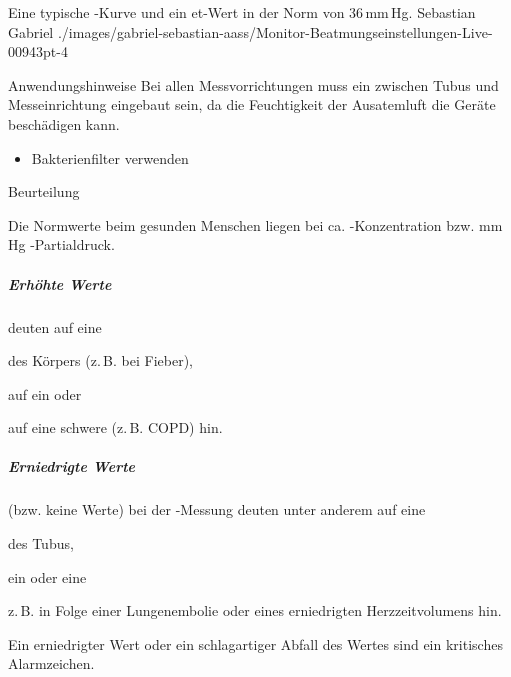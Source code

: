 {Eine typische -Kurve und ein et-Wert in der Norm von 36\,mm\,Hg.}%
{}%
{Sebastian Gabriel}%
{}%
{./images/gabriel-sebastian-aass/Monitor-Beatmungseinstellungen-Live-00943pt-4}%
{}%

\TextSlide
{Anwendungshinweise}%
{%
Bei allen Messvorrichtungen muss ein  
zwischen Tubus und Messeinrichtung eingebaut sein, 
da die Feuchtigkeit der Ausatemluft die Geräte beschädigen kann. 
}%
{
\begin{itemize}
  \item Bakterienfilter verwenden 
\end{itemize}
}

\TextSlide
{Beurteilung}%
{%
Die Normwerte beim gesunden Menschen liegen bei ca. 
\PC* {}-Konzentration 
bzw.  mm\,Hg -Partialdruck.
%



\subparagraph{Erhöhte Werte} deuten 
auf eine 
\begin{inparaitem}
  \item {} des Körpers 
  (z.\,B. bei Fieber),  
  \item auf ein  oder
  \item auf eine schwere  (z.\,B. COPD) hin.
\end{inparaitem}

\subparagraph{Erniedrigte Werte} 
(bzw. keine Werte) bei der -Messung 
deuten unter anderem auf eine 
\begin{inparaitem}
  \item {} des Tubus, 
  \item ein  
  oder eine 
  \item {} 
  z.\,B. in Folge einer Lungenembolie 
  oder eines erniedrigten Herzzeitvolumens
  hin.
\end{inparaitem}
%
Ein erniedrigter Wert oder ein schlagartiger Abfall des Wertes sind ein kritisches Alarmzeichen.

%
}%
